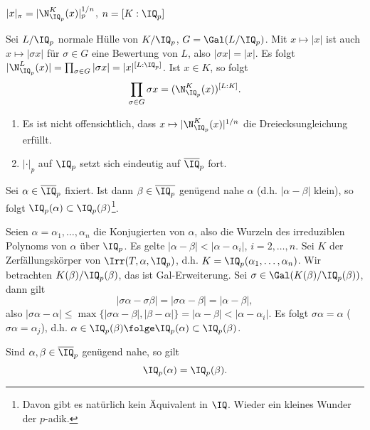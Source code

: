 \begin{Folgerung}
 $|x|_\pi=|\N_{\IQ_p}^K(x)|_p^{1/n}$, $n=[K:\IQ_p]$
\end{Folgerung}

\begin{Beweis}
 Sei $L/\IQ_p$ normale Hülle von $K/\IQ_p$, $G=\Gal(L/\IQ_p)$. Mit $x\mapsto |x|$ ist auch $x\mapsto |\sigma x|$ für $\sigma\in G$ eine Bewertung von $L$, also $|\sigma x|=|x|$. Es folgt $|\N_{\IQ_p}^L(x)|=\prod_{\sigma\in G} |\sigma x|=|x|^{[L:\IQ_p]}$. Ist $x\in K$, so folgt 
 \[ \prod_{\sigma\in G} \sigma x = (\N_{\IQ_p}^K(x))^{[L:K]}.\]
\end{Beweis}

\begin{Bemerkung}
 \begin{enumerate}
  \item Es ist nicht offensichtlich, dass $x\mapsto |\N_{\IQ_p}^K(x)|^{1/n}$ die Dreiecksungleichung erfüllt.
  \item $|\cdot|_p$ auf $\IQ_p$ setzt sich eindeutig auf $\overline\IQ_p$ fort.
 \end{enumerate}
\end{Bemerkung}

\begin{Fakt}
 Sei $\alpha\in\overline\IQ_p$ fixiert. Ist dann $\beta\in\overline{\IQ_p}$ genügend nahe $\alpha$ (d.h. $|\alpha-\beta|$ klein), so folgt $\IQ_p(\alpha)\subset \IQ_p(\beta)$\footnote{Davon gibt es natürlich kein Äquivalent in $\IQ$. \glqq Wieder ein kleines Wunder der $p$-adik.\grqq}.
\end{Fakt}

\begin{Beweis}
 Seien $\alpha=\alpha_1,\ldots,\alpha_n$ die Konjugierten von $\alpha$, also die Wurzeln des irreduziblen Polynoms von $\alpha$ über $\IQ_p$. Es gelte $|\alpha-\beta|<|\alpha-\alpha_i|$, $i=2,\ldots,n$.
 Sei $K$ der Zerfällungskörper von $\Irr(T,\alpha,\IQ_p)$, d.h. $K=\IQ_p(\alpha_1,\ldots,\alpha_n)$. Wir betrachten $K(\beta)/\IQ_p(\beta)$, das ist Gal-Erweiterung. Sei $\sigma\in \Gal(K(\beta)/\IQ_p(\beta))$, dann gilt
 \[ |\sigma\alpha-\sigma\beta|=|\sigma\alpha-\beta|=|\alpha-\beta|,\]
 also $|\sigma\alpha-\alpha|\leq \max\{|\sigma\alpha-\beta|, |\beta-\alpha|\}=|\alpha-\beta|<|\alpha-\alpha_i|$. Es folgt $\sigma\alpha=\alpha$ ($\sigma\alpha=\alpha_j$), d.h. $\alpha\in\IQ_p(\beta)\folge \IQ_p(\alpha)\subset\IQ_p(\beta)$.
\end{Beweis}

\begin{Folgerung}
 Sind $\alpha,\beta\in\overline\IQ_p$ genügend nahe, so gilt \[ \IQ_p(\alpha)=\IQ_p(\beta).\]
\end{Folgerung}

